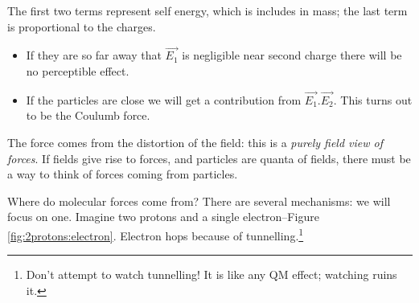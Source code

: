 \documentclass[]{article}
\begin{document}
The first two terms represent self energy, which is includes in mass; the last term is proportional to the charges.
\begin{itemize}
	\item  If they are so far away that $\vec{E_1}$ is negligible near second charge there will be no perceptible effect.
	\item If the particles are close we will get a contribution from $\vec{E_1}.\vec{E_2}$. This turns out to be the Coulumb force. 
\end{itemize}

The force comes from the distortion of the field: this is a \emph{purely field view of forces}. If fields give rise to forces, and particles are quanta of fields, there must be a way to think of forces coming from particles.

Where do molecular forces come from? There are several mechanisms: we will focus on one. Imagine two protons and a single electron--Figure \ref{fig:2protons:electron}. Electron hops because of tunnelling.\footnote{Don't attempt to watch tunnelling! It is like any QM effect; watching ruins it.}
\end{document}
